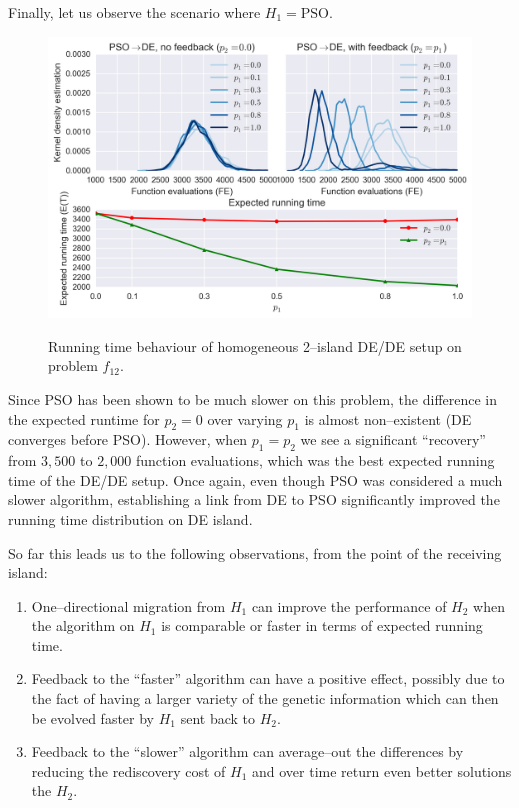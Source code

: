 \documentclass{sig-alternate}
\begin{document}
Finally, let us observe the scenario where $H_1 = \mbox{PSO}$.
\begin{figure}[ht]
  \centering
  \includegraphics[width=\columnwidth]{figures/single_pso_jde_cec_7.png}
  \label{fig:single_pso_jde_7}
 \caption{Running time behaviour of homogeneous 2--island DE/DE setup on problem $f_{12}$.}
\end{figure}
Since PSO has been shown to be much slower on this problem, the difference in the expected runtime for $p_2=0$ over varying $p_1$ is almost non--existent (DE converges before PSO).
However, when $p_1=p_2$ we see a significant ``recovery'' from $3,500$ to $2,000$ function evaluations, which was the best expected running time of the DE/DE setup.
Once again, even though PSO was considered a much slower algorithm, establishing a link from DE to PSO significantly improved the running time distribution on DE island.

So far this leads us to the following observations, from the point of the receiving island:
\begin{enumerate}
    \item One--directional migration from $H_1$ can improve the performance of $H_2$ when the algorithm on $H_1$ is comparable or faster in terms of expected running time.
    \item Feedback to the ``faster'' algorithm can have a positive effect, possibly due to the fact of having a larger variety of the genetic information which can then be evolved faster by $H_1$ sent back to $H_2$.
    \item Feedback to the ``slower'' algorithm can average--out the differences by reducing the rediscovery cost of $H_1$ and over time return even better solutions the $H_2$.
\end{enumerate}
\end{document}
